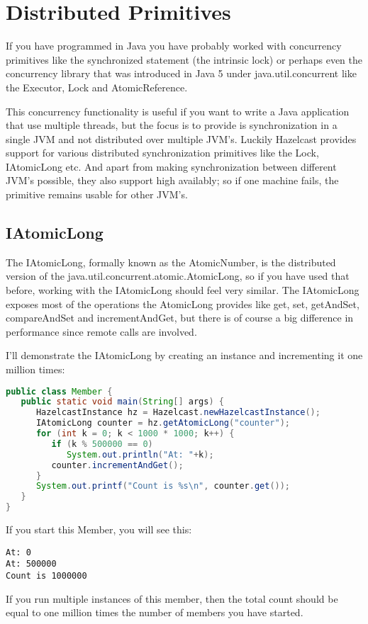 \chapter{Distributed Primitives}
If you have programmed in Java you have probably worked with concurrency primitives like the synchronized statement (the intrinsic lock) or perhaps even the concurrency library that was introduced in Java 5 under java.util.concurrent like the Executor, Lock and AtomicReference.

This concurrency functionality is useful if you want to write a Java application that use multiple threads, but the focus is to provide is synchronization in a single JVM and not distributed over multiple JVM's. Luckily Hazelcast provides support for various distributed synchronization primitives like the Lock, IAtomicLong etc. And apart from making synchronization between different JVM's possible, they also support high availably; so if one machine fails, the primitive remains usable for other JVM's.

\section{IAtomicLong}
The IAtomicLong, formally known as the AtomicNumber, is the distributed version of the java.util.concurrent.atomic.AtomicLong, so if you have used that before, working with the IAtomicLong should feel very similar. The IAtomicLong exposes most of the operations the AtomicLong provides like get, set, getAndSet, compareAndSet and incrementAndGet, but there is of course a big difference in performance since remote calls are involved.

I'll demonstrate the IAtomicLong by creating an instance and incrementing it one million times:
\begin{lstlisting}[language=java]
public class Member {
   public static void main(String[] args) {
      HazelcastInstance hz = Hazelcast.newHazelcastInstance();
      IAtomicLong counter = hz.getAtomicLong("counter");
      for (int k = 0; k < 1000 * 1000; k++) {
         if (k % 500000 == 0) 
            System.out.println("At: "+k);
         counter.incrementAndGet();
      }
      System.out.printf("Count is %s\n", counter.get());
   }
}
\end{lstlisting}
If you start this Member, you will see this:
\begin{lstlisting}
At: 0
At: 500000
Count is 1000000
\end{lstlisting}
If you run multiple instances of this member, then the total count should be equal to one million times the number of members you have started.

